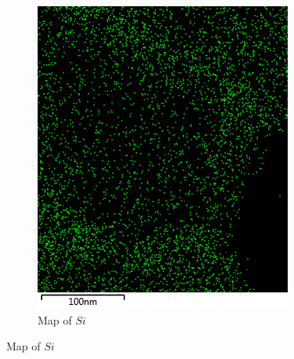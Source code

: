 \documentclass[12pt,a4paper]{article}
\begin{document}
\begin{figure}[htbp]
\begin{subfigure}[b]{0.35\textwidth}
    \includegraphics[width=\textwidth]{Data/Si Map.png}
    \caption{Map of $Si$}
    \label{fig:si_map}
  \end{subfigure}


\end{figure}
\end{document}

